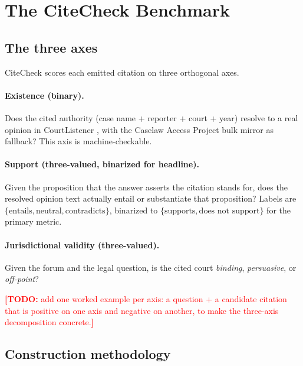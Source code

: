 \documentclass[11pt]{article}
\newcommand{\todo}[1]{\textcolor{red}{\textbf{[TODO:} #1\textbf{]}}}
\begin{document}
\section{The CiteCheck Benchmark}
\label{sec:benchmark}

\subsection{The three axes}
\label{sec:benchmark:axes}

CiteCheck scores each emitted citation on three orthogonal axes.

\paragraph{Existence (binary).}
Does the cited authority (case name + reporter + court + year)
resolve to a real opinion in CourtListener \citep{courtlistener},
with the Caselaw Access Project \citep{cap2018} bulk mirror as
fallback? This axis is machine-checkable.

\paragraph{Support (three-valued, binarized for headline).}
Given the proposition that the answer asserts the citation stands for,
does the resolved opinion text actually entail or substantiate that
proposition? Labels are
$\{\text{entails}, \text{neutral}, \text{contradicts}\}$, binarized to
$\{\text{supports}, \text{does not support}\}$ for the primary metric.

\paragraph{Jurisdictional validity (three-valued).}
Given the forum and the legal question, is the cited court
\emph{binding}, \emph{persuasive}, or \emph{off-point}?

\todo{add one worked example per axis: a question + a candidate
citation that is positive on one axis and negative on another, to
make the three-axis decomposition concrete.}

\subsection{Construction methodology}
\label{sec:benchmark:construction}
\end{document}
